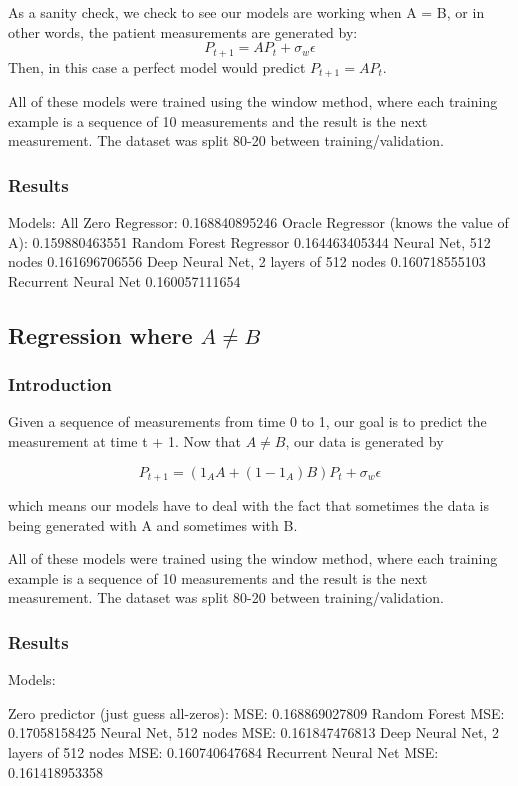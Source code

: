 \documentclass[12pt]{article}
\renewcommand{\=}[1]{\stackrel{#1}{=}} %
\theoremstyle{definition}
\begin{document}
As a sanity check, we check to see our models are working when A = B, or in other words, the patient measurements are generated by: 
$$P_{t+1} = AP_{t} + \sigma_w \epsilon$$
Then, in this case a perfect model would predict $P_{t + 1} = AP_t$.  

All of these models were trained using the window method, where each training example is a sequence of 10 measurements and the result is the next measurement.  The dataset was split 80-20 between training/validation.
\subsubsection{Results}
Models:
All Zero Regressor:
0.168840895246
Oracle Regressor (knows the value of A):
0.159880463551
Random Forest Regressor 
0.164463405344
Neural Net, 512 nodes
0.161696706556
Deep Neural Net, 2 layers of 512 nodes
0.160718555103
Recurrent Neural Net 
0.160057111654

\subsection{Regression where $A \neq B$}
\subsubsection{Introduction}
Given a sequence of measurements from time 0 to 1, our goal is to predict the measurement at time t + 1.  Now that $A \neq B$, our data is generated by 

$$P_{t+1} = (1_AA+(1-1_A)B)P_{t} + \sigma_w \epsilon$$

which means our models have to deal with the fact that sometimes the data is being generated with A and sometimes with B.  

All of these models were trained using the window method, where each training example is a sequence of 10 measurements and the result is the next measurement.  The dataset was split 80-20 between training/validation.
\subsubsection{Results}

Models:

Zero predictor (just guess all-zeros):
MSE: 0.168869027809
Random Forest 
MSE: 0.17058158425
Neural Net, 512 nodes
MSE: 0.161847476813
Deep Neural Net, 2 layers of 512 nodes
MSE: 0.160740647684
Recurrent Neural Net 
MSE: 0.161418953358
\end{document}
